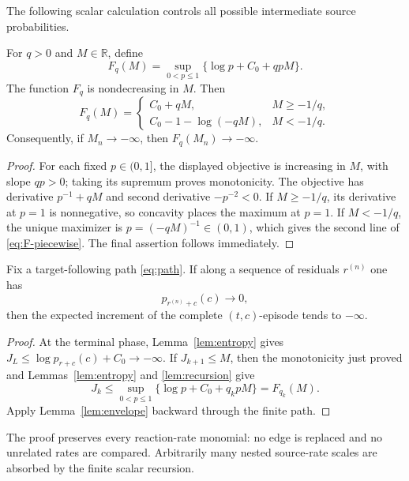 The following scalar calculation controls all possible intermediate source
probabilities.

\begin{lemma}\label{lem:envelope}
For \(q>0\) and \(M\in\mathbb R\), define
\[
  F_q(M)=\sup_{0<p\le1}\{\log p+C_0+qpM\}.
\]
The function \(F_q\) is nondecreasing in \(M\).
Then
\begin{equation}\label{eq:F-piecewise}
  F_q(M)=
  \begin{cases}
    C_0+qM,&M\ge-1/q,\\
    C_0-1-\log(-qM),&M<-1/q.
  \end{cases}
\end{equation}
Consequently, if \(M_n\to-\infty\), then \(F_q(M_n)\to-\infty\).
\end{lemma}

\begin{proof}
For each fixed \(p\in(0,1]\), the displayed objective is increasing in
\(M\), with slope \(qp>0\); taking its supremum proves monotonicity.
The objective has derivative \(p^{-1}+qM\) and second derivative
\(-p^{-2}<0\).  If \(M\ge-1/q\), its derivative at \(p=1\) is nonnegative,
so concavity places the maximum at \(p=1\).  If \(M<-1/q\), the unique
maximizer is \(p=(-qM)^{-1}\in(0,1)\), which gives the second line of
\eqref{eq:F-piecewise}.  The final assertion follows immediately.
\end{proof}

\begin{proposition}\label{prop:propagation}
Fix a target-following path \eqref{eq:path}.  If along a sequence of residuals
\(r^{(n)}\) one has
\[
  p_{r^{(n)}+c}(c)\longrightarrow0,
\]
then the expected increment of the complete \((t,c)\)-episode tends to
\(-\infty\).
\end{proposition}

\begin{proof}
At the terminal phase, Lemma~\ref{lem:entropy} gives
\(J_L\le\log p_{r+c}(c)+C_0\to-\infty\).  If \(J_{k+1}\le M\), then the
monotonicity just proved and
Lemmas~\ref{lem:entropy} and \ref{lem:recursion} give
\[
  J_k\le\sup_{0<p\le1}\{\log p+C_0+q_kpM\}=F_{q_k}(M).
\]
Apply Lemma~\ref{lem:envelope} backward through the finite path.
\end{proof}

The proof preserves every reaction-rate monomial: no edge is replaced and no
unrelated rates are compared.  Arbitrarily many nested source-rate scales are
absorbed by the finite scalar recursion.


